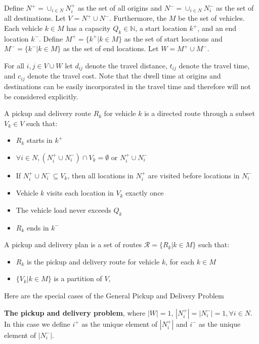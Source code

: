 				Define $N^+ = \cup_{i \in N} N_i^+$ as the set of all origins and $N^- = \cup_{i \in N}N_i^-$ as the set of all destinations. Let $V = N^+ \cup N^-$. Furthermore, the $M$ be the set of vehicles. Each vehicle $k \in M$ has a capacity $Q_k \in \mathbb{N}$, a start location $k^+$, and an end location $k^-$. Define $M^+ = \{k^+|k\in M\}$ as the set of start locations and $M^- = \{k^-|k\in M\}$ as the set of end locations. Let $W = M^+ \cup M^-$.

				For all $i, j \in V\cup W$ let $d_{ij}$ denote the travel distance, $t_{ij}$ denote the travel time, and $c_{ij}$ denote the travel cost. Note that the dwell time at origins and destinations can be easily incorporated in the travel time and therefore will not be considered explicitly.

				\begin{definition}
					A pickup and delivery route $R_k$ for vehicle $k$ is a directed route through a subset $V_k \in V$ such that:
					\begin{itemize}
						\item $R_k$ starts in $k^+$
						\item $\forall i \in N, (N_i^+ \cup N_i^-) \cap V_k = \emptyset \text{ or } N_i^+ \cup N_i^-$
						\item If $N_i^+ \cup N_i^- \subseteq V_k$, then all locations in $N_i^+$ are visited before locations in $N_i^-$
						\item Vehicle $k$ visits each location in $V_k$ exactly once
						\item The vehicle load never exceeds $Q_k$
						\item $R_k$ ends in $k^-$
					\end{itemize}
				\end{definition}

				\begin{definition}
					A pickup and delivery plan is a set of routes $\mathcal{R} = \{R_k |k \in M\}$ such that:
					\begin{itemize}
						\item $R_k$ is the pickup and delivery route for vehicle $k$, for each $k \in M$
						\item $\{V_k |k \in M\}$ is a partition of $V$,
					\end{itemize}
				\end{definition}

				Here are the special cases of the General Pickup and Delivery Problem
				\begin{example}
					\textbf{The pickup and delivery problem}, where $|W| = 1$, $|N_i^+| = |N_i^-| = 1, \forall i \in N$. In this case we define $i^+$ as the unique element of $|N_i^+|$ and $i^-$ as the unique element of $|N_i^-|$.
				\end{example}


